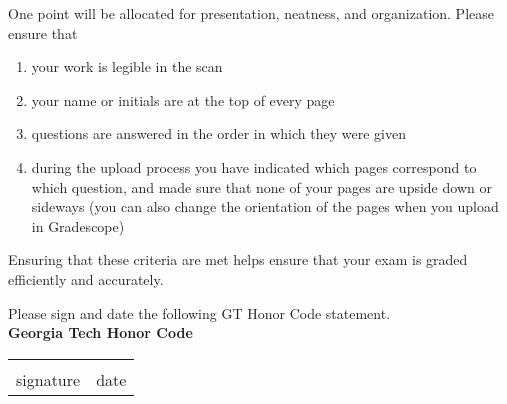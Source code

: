 \documentclass[12pt]{exam}
\begin{document}
\begin{questions}
    
    
    
    \newpage \Initials
    \question[1] One point will be allocated for presentation, neatness, and organization. Please ensure that
    \begin{enumerate}
        \item your work is legible in the scan
        \item your name or initials are at the top of every page
        \item questions are answered in the order in which they were given
        \item during the upload process you have indicated which pages correspond to which question, and made sure that none of your pages are upside down or sideways (you can also change the orientation of the pages when you upload in Gradescope)
    \end{enumerate}
    Ensuring that these criteria are met helps ensure that your exam is graded efficiently and accurately. 
        
    Please sign and date the following GT Honor Code statement. \\ 
    
    \vspace{6pt}
    \textbf{Georgia Tech Honor Code}\\
    \GTHonorCode
    
    \begin{center}
        \def\arraystretch{0.35}%
        \begin{tabular}{ b{8cm} b{8cm} }
        \vspace{.5cm} \underline{\hspace{7cm}} & \vspace{.5cm} \underline{\hspace{4.5cm}}  \tabularnewline
        \vspace{6pt} signature & \vspace{6pt} date    
        \end{tabular}
    \end{center}
\end{questions}
\end{document}
